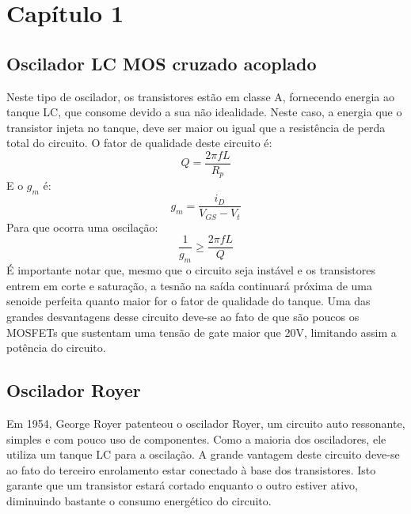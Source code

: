 \chapter{Capítulo 1}\label{chap-1}
\section{Oscilador LC MOS cruzado acoplado}
Neste tipo de oscilador, os transistores estão em classe A, fornecendo energia ao tanque LC, que consome devido a sua não idealidade. Neste caso, a energia que o transistor injeta no tanque, deve ser maior ou igual que a resistência de perda total do circuito. O fator de qualidade deste circuito é:
\begin{equation}
Q = \frac{2\pi f L}{R_p}
\end{equation}
E o $g_m$ é:
\begin{equation}
g_m = \frac{i_D}{V_{GS} - V_t}
\end{equation}
Para que ocorra uma oscilação:
\begin{equation}
\frac{1}{g_m} \geq \frac{2\pi f L}{Q}
\end{equation}
É importante notar que, mesmo que o circuito seja instável e os transistores entrem em corte e saturação, a tesnão na saída continuará próxima de uma senoide perfeita quanto maior for o fator de qualidade do tanque.
Uma das grandes desvantagens desse circuito deve-se ao fato de que são poucos os MOSFETs que sustentam uma tensão de gate maior que 20V, limitando assim a potência do circuito.


\section{Oscilador Royer}
Em 1954, George Royer patenteou o oscilador Royer, um circuito auto ressonante, simples e com pouco uso de componentes. Como a maioria dos osciladores, ele utiliza um tanque LC para a oscilação. A grande vantagem deste circuito deve-se ao fato do terceiro enrolamento estar conectado à base dos transistores. Isto garante que um transistor estará cortado enquanto o outro estiver ativo, diminuindo bastante o consumo energético do circuito.


